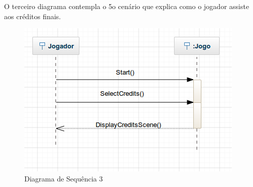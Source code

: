 O terceiro diagrama contempla o 5o cenário que explica como o jogador assiste aos créditos finais.

\begin{figure}[H]
\centering\includegraphics[scale=0.5]{figuras/SequenceDiagram3.png}
\caption{Diagrama de Sequência 3}
\end{figure}